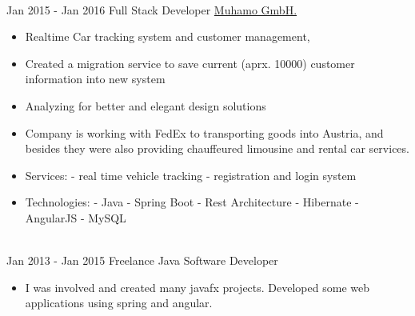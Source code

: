 \documentclass[letterpaper]{twentysecondcv} %
\begin{document}
\begin{twenty}
{\begin{itemize}
    \end{itemize}}
        \\
	\twentyitem
    	{Jan 2015 -}
		{Jan 2016}
        {Full Stack Developer}
        {\href{http://www.muhamo.com}{Muhamo GmbH.}}
        {}
        {
        {\begin{itemize}
        \item Realtime Car tracking system and customer management,
        \item Created a migration service to save current (aprx. 10000) customer information into new system
        \item Analyzing for better and elegant design solutions
        \item Company is working with FedEx to transporting goods into Austria, and besides they were also providing chauffeured limousine and rental car services.
        \item Services:
        - real time vehicle tracking
        - registration and login system
        \item Technologies:
        - Java
        - Spring Boot
        - Rest Architecture
        - Hibernate
        - AngularJS
        - MySQL
    \end{itemize}}
        }
    \\   
    \twentyitem
   		{Jan 2013 -}
		{Jan 2015}
        {Freelance Java Software Developer }
        {}
        {}
        {
        {\begin{itemize}
        \item I was involved and created many javafx projects. Developed some web applications using spring and angular.
    \end{itemize}}
        }
     \\
        
\end{twenty}
\end{document}

